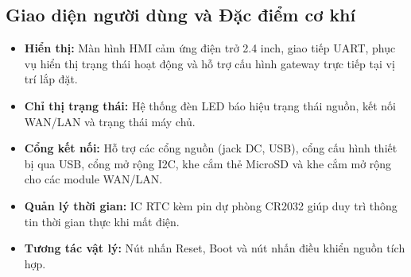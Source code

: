 \subsection{Giao diện người dùng và Đặc điểm cơ khí}
    \begin{itemize}
        \item \textbf{Hiển thị:} Màn hình HMI cảm ứng điện trở 2.4 inch, giao tiếp UART, phục vụ hiển thị trạng thái hoạt động và hỗ trợ cấu hình gateway trực tiếp tại vị trí lắp đặt.
        \item \textbf{Chỉ thị trạng thái:} Hệ thống đèn LED báo hiệu trạng thái nguồn, kết nối WAN/LAN và trạng thái máy chủ.
        \item \textbf{Cổng kết nối:} Hỗ trợ các cổng nguồn (jack DC, USB), cổng cấu hình thiết bị qua USB, cổng mở rộng I2C, khe cắm thẻ MicroSD và khe cắm mở rộng cho các module WAN/LAN.
        \item \textbf{Quản lý thời gian:} IC RTC kèm pin dự phòng CR2032 giúp duy trì thông tin thời gian thực khi mất điện.
        \item \textbf{Tương tác vật lý:} Nút nhấn Reset, Boot và nút nhấn điều khiển nguồn tích hợp.
    \end{itemize}